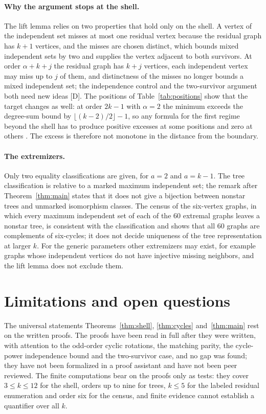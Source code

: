 \paragraph{Why the argument stops at the shell.}
The lift lemma relies on two properties that hold only on the shell.
A vertex of the independent set misses at most one residual vertex because the residual graph has $k+1$ vertices, and the misses are chosen distinct, which bounds mixed independent sets by two and supplies the vertex adjacent to both survivors.
At order $\alpha+k+j$ the residual graph has $k+j$ vertices, each independent vertex may miss up to $j$ of them, and distinctness of the misses no longer bounds a mixed independent set; the independence control and the two-survivor argument both need new ideas [D].
The positions of Table~\ref{tab:positions} show that the target changes as well: at order $2k-1$ with $\alpha=2$ the minimum exceeds the degree-sum bound by $\lfloor(k-2)/2\rfloor-1$, so any formula for the first regime beyond the shell has to produce positive excesses at some positions and zero at others \cite{Next}.
The excess is therefore not monotone in the distance from the boundary.

\paragraph{The extremizers.}
Only two equality classifications are given, for $a=2$ and $a=k-1$.
The tree classification is relative to a marked maximum independent set; the remark after Theorem~\ref{thm:main} states that it does not give a bijection between nonstar trees and unmarked isomorphism classes.
The census of the six-vertex graphs, in which every maximum independent set of each of the 60 extremal graphs leaves a nonstar tree, is consistent with the classification and shows that all 60 graphs are complements of six-cycles; it does not decide uniqueness of the tree representation at larger $k$.
For the generic parameters other extremizers may exist, for example graphs whose independent vertices do not have injective missing neighbors, and the lift lemma does not exclude them.

\section{Limitations and open questions}\label{sec:limitations}

The universal statements Theorems~\ref{thm:shell}, \ref{thm:cycles} and~\ref{thm:main} rest on the written proofs.
The proofs have been read in full after they were written, with attention to the odd-order cyclic rotations, the matching parity, the cycle-power independence bound and the two-survivor case, and no gap was found; they have not been formalized in a proof assistant and have not been peer reviewed.
The finite computations bear on the proofs only as tests: they cover $3\le k\le12$ for the shell, orders up to nine for trees, $k\le5$ for the labeled residual enumeration and order six for the census, and finite evidence cannot establish a quantifier over all $k$.

